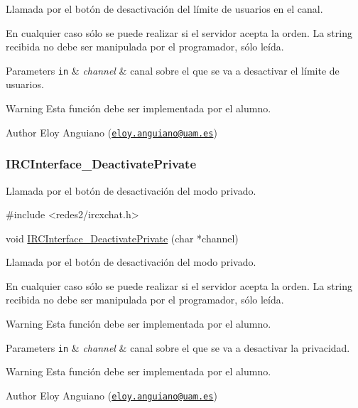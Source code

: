 Llamada por el botón de desactivación del límite de usuarios en el canal.

En cualquier caso sólo se puede realizar si el servidor acepta la orden. La string recibida no debe ser manipulada por el programador, sólo leída.


\begin{DoxyParams}[1]{Parameters}
\mbox{\tt in}  & {\em channel} & canal sobre el que se va a desactivar el límite de usuarios.\\
\hline
\end{DoxyParams}
\begin{DoxyWarning}{Warning}
Esta función debe ser implementada por el alumno.
\end{DoxyWarning}
\begin{DoxyAuthor}{Author}
Eloy Anguiano (\href{mailto:eloy.anguiano@uam.es}{\tt eloy.\-anguiano@uam.\-es})
\end{DoxyAuthor}


 \hypertarget{IRCInterface_DeactivatePrivate}{}\subsubsection{I\-R\-C\-Interface\-\_\-\-Deactivate\-Private}\label{IRCInterface_DeactivatePrivate}
Llamada por el botón de desactivación del modo privado.


\begin{DoxyCode}
\textcolor{preprocessor}{#include <redes2/ircxchat.h>}

\textcolor{keywordtype}{void} \hyperlink{xchat2_8c_a8a6141803691ba327f11ba763ad075d4}{IRCInterface\_DeactivatePrivate} (\textcolor{keywordtype}{char} *channel)
\end{DoxyCode}


Llamada por el botón de desactivación del modo privado.

En cualquier caso sólo se puede realizar si el servidor acepta la orden. La string recibida no debe ser manipulada por el programador, sólo leída.

\begin{DoxyWarning}{Warning}
Esta función debe ser implementada por el alumno.
\end{DoxyWarning}

\begin{DoxyParams}[1]{Parameters}
\mbox{\tt in}  & {\em channel} & canal sobre el que se va a desactivar la privacidad.\\
\hline
\end{DoxyParams}
\begin{DoxyWarning}{Warning}
Esta función debe ser implementada por el alumno.
\end{DoxyWarning}
\begin{DoxyAuthor}{Author}
Eloy Anguiano (\href{mailto:eloy.anguiano@uam.es}{\tt eloy.\-anguiano@uam.\-es})
\end{DoxyAuthor}


